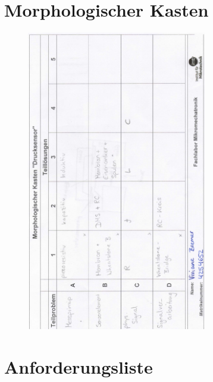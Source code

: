 \section{Morphologischer Kasten}
\label{sec:Anhang_1}

\begin{figure}[H]
	\centering
	\includegraphics[width=0.7\textwidth]{figures/MorphologischerKasten_Bremer.png}
\end{figure}

\newpage
\section{Anforderungsliste}
\label{sec:Anhang_2}

